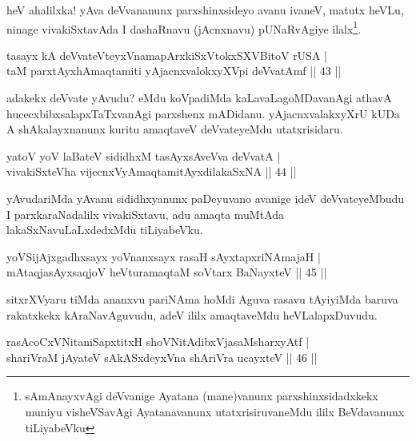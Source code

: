 \begin{artha}
heV ahalilxka! yAva deVvananunx parxshinxsideyo avanu ivaneV, matutx heVLu, ninage vivakiSxtavAda I dashaRnavu (jAcnxnavu) pUNaRvAgiye ilalx\footnote[1]{sAmAnayxvAgi deVvanige Ayatana (mane)vanunx parxshinxsidadxkekx muniyu visheVSavAgi Ayatanavanunx utatxrisiruvaneMdu ililx BeVdavanunx tiLiyabeVku}.
\end{artha}


\begin{shl}
tasayx kA deVvateVteyxVnamapArxkiSxVtokxSXVBitoV rUSA |\\
taM parxtAyxhAmaqtamiti yAjacnxvalokxyXV\s pi deVvatAmf \hfill || 43 ||
\end{shl}

\begin{artha}%
adakekx deVvate yAvudu? eMdu koVpadiMda kaLavaLagoMDavanAgi athavA hucecxbibxsalapxTaTxvanAgi parxshenx mADidanu. yAjacnxvalakxyXrU kUDa A shAkalayxnanunx kuritu amaqtaveV deVvateyeMdu utatxrisidaru.
\end{artha}


\begin{shl}
yatoV yoV laBateV sididhxM tasAyxsAveVva deVvatA |\\
vivakiSxteVha vijecnxVyA\s maqtamitAyxdilakaSxNA \hfill || 44 ||
\end{shl}

\begin{artha}
yAvudariMda yAvanu sididhxyanunx paDeyuvano avanige ideV deVvate\-yeMbudu I parxkaraNadalilx vivakiSxtavu, adu amaqta muMtAda lakaSxNavuLaLxdedxMdu tiLiyabeVku.
\end{artha}


\begin{shl}
yoVSijAjxgadhxsayx yoVnanxsayx rasaH sAyxtapxriNAmajaH |\\
mAtaqjasAyxsaqjoV heVturamaqtaM soV\s tarx BaNayxteV \hfill || 45 ||
\end{shl}

\begin{artha}
sitxrXVyaru tiMda ananxvu pariNAma hoMdi Aguva rasavu tAyiyiMda baruva rakatxkekx kAraNavAguvudu, adeV ililx amaqtaveMdu heVLalapxDuvudu.
\end{artha}

\begin{shl}
rasAcoCxVNitaniSapxtitxH shoVNitAdibxVjasaMsharxyAtf |\\
shariVraM jAyateV sAkASxdeyxVna shAriVra ucayxteV \hfill || 46 ||
\end{shl}

